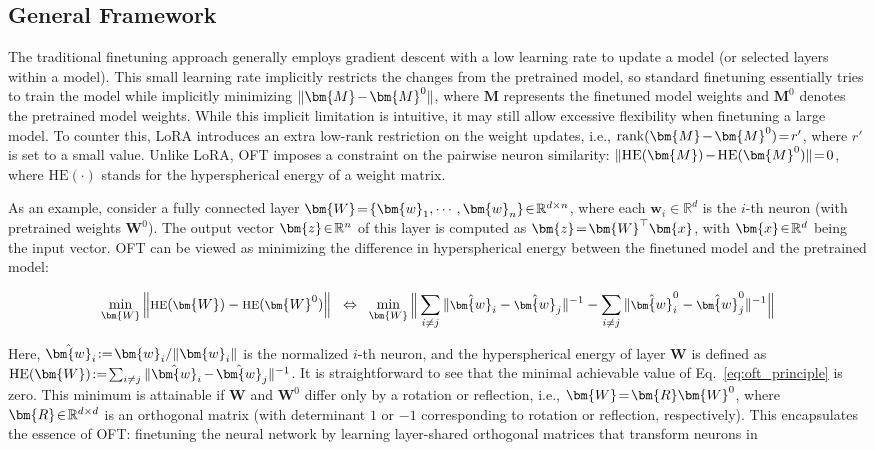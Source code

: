 \subsection{General Framework}

The traditional finetuning approach generally employs gradient descent with a low learning rate to update a model (or selected layers within a model). This small learning rate implicitly restricts the changes from the pretrained model, so standard finetuning essentially tries to train the model while implicitly minimizing $\thickmuskip=2mu \medmuskip=2mu \| \bm{M} - \bm{M}^0\|$, where $\bm{M}$ represents the finetuned model weights and $\bm{M}^0$ denotes the pretrained model weights. While this implicit limitation is intuitive, it may still allow excessive flexibility when finetuning a large model. To counter this, LoRA introduces an extra low-rank restriction on the weight updates, i.e., $\thickmuskip=2mu \medmuskip=2mu \text{rank}(\bm{M} - \bm{M}^0)=r'$, where $r'$ is set to a small value. Unlike LoRA, OFT imposes a constraint on the pairwise neuron similarity: $\thickmuskip=2mu \medmuskip=2mu \| \text{HE}(\bm{M})-\text{HE}(\bm{M}^0) \|=0$, where $\text{HE}(\cdot)$ stands for the hyperspherical energy of a weight matrix. 

As an example, consider a fully connected layer $\thickmuskip=2mu \medmuskip=2mu \bm{W}=\{\bm{w}_1,\cdots,\bm{w}_n\}\in\mathbb{R}^{d\times n}$, where each $\bm{w}_i\in\mathbb{R}^d$ is the $i$-th neuron (with pretrained weights $\bm{W}^0$). The output vector $\thickmuskip=2mu \medmuskip=2mu \bm{z}\in\mathbb{R}^n$ of this layer is computed as $\thickmuskip=2mu \medmuskip=2mu \bm{z}=\bm{W}^\top\bm{x}$, with $\thickmuskip=2mu \medmuskip=2mu \bm{x}\in\mathbb{R}^d$ being the input vector. OFT can be viewed as minimizing the difference in hyperspherical energy between the finetuned model and the pretrained model:

\begin{equation}\label{eq:oft_principle}
\footnotesize
\min_{\bm{W}} \left\| \text{HE}(\bm{W})-\text{HE}(\bm{W}^0)\right\|~~\Leftrightarrow~~\min_{\bm{W}} \bigg{\|} \sum_{i\neq j} \|\hat{\bm{w}}_i-\hat{\bm{w}}_j\|^{-1}-\sum_{i\neq j} \|\hat{\bm{w}}^0_i-\hat{\bm{w}}^0_j\|^{-1}\bigg{\|}
\end{equation}

Here, $\thickmuskip=2mu \medmuskip=2mu \hat{\bm{w}}_i := \bm{w}_i/\|\bm{w}_i\|$ is the normalized $i$-th neuron, and the hyperspherical energy of layer $\bm{W}$ is defined as $\thickmuskip=2mu \medmuskip=2mu \text{HE}(\bm{W}) := \sum_{i\neq j} \|\hat{\bm{w}}_i - \hat{\bm{w}}_j\|^{-1}$. It is straightforward to see that the minimal achievable value of Eq.~\eqref{eq:oft_principle} is zero. This minimum is attainable if $\bm{W}$ and $\bm{W}^0$ differ only by a rotation or reflection, i.e., $\thickmuskip=2mu \medmuskip=2mu \bm{W} = \bm{R} \bm{W}^0$, where $\thickmuskip=2mu \medmuskip=2mu \bm{R} \in \mathbb{R}^{d \times d}$ is an orthogonal matrix (with determinant $1$ or $-1$ corresponding to rotation or reflection, respectively). This encapsulates the essence of OFT: finetuning the neural network by learning layer-shared orthogonal matrices that transform neurons in


